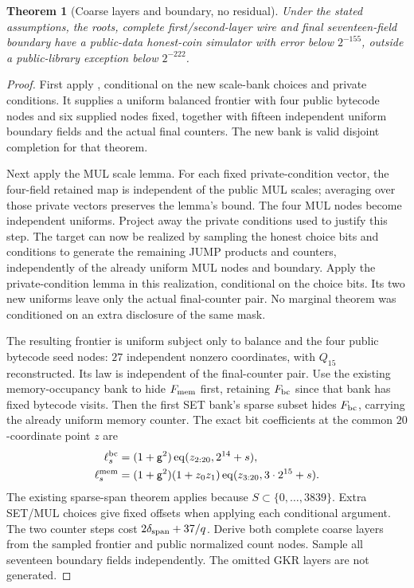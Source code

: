 \documentclass[11pt]{article}
\newtheorem{theorem}{Theorem}
\begin{document}
\begin{theorem}[Coarse layers and boundary, no residual]
Under the stated assumptions, the roots, complete first/second-layer wire and final seventeen-field boundary have a public-data honest-coin simulator with error below $2^{-155}$, outside a public-library exception below $2^{-222}$.
\end{theorem}
\begin{proof}
First apply , conditional on the new scale-bank choices and private conditions. It supplies a uniform balanced frontier with four public bytecode nodes and six supplied nodes fixed, together with fifteen independent uniform boundary fields and the actual final counters. The new bank is valid disjoint completion for that theorem.

Next apply the MUL scale lemma. For each fixed private-condition vector, the four-field retained map is independent of the public MUL scales; averaging over those private vectors preserves the lemma's bound. The four MUL nodes become independent uniforms. Project away the private conditions used to justify this step. The target can now be realized by sampling the honest choice bits and conditions to generate the remaining JUMP products and counters, independently of the already uniform MUL nodes and boundary. Apply the private-condition lemma in this realization, conditional on the choice bits. Its two new uniforms leave only the actual final-counter pair. No marginal theorem was conditioned on an extra disclosure of the same mask.

The resulting frontier is uniform subject only to balance and the four public bytecode seed nodes: $27$ independent nonzero coordinates, with $Q_{15}$ reconstructed. Its law is independent of the final-counter pair. Use the existing memory-occupancy bank to hide $F_{\rm mem}$ first, retaining $F_{\rm bc}$ since that bank has fixed bytecode visits. Then the first SET bank's sparse subset hides $F_{\rm bc}$, carrying the already uniform memory counter. The exact bit coefficients at the common $20$-coordinate point $z$ are
\[
\begin{aligned}
 \ell_s^{\rm bc}&=(1+\mathsf{g}^2)\operatorname{eq}(z_{2:20},2^{14}+s),\\
 \ell_s^{\rm mem}&=(1+\mathsf{g}^2)(1+z_0z_1)\operatorname{eq}(z_{3:20},3\cdot2^{15}+s).
\end{aligned}
\]
The existing sparse-span theorem applies because $S\subset\{0,\ldots,3839\}$. Extra SET/MUL choices give fixed offsets when applying each conditional argument. The two counter steps cost $2\delta_{\rm span}+37/q$. Derive both complete coarse layers from the sampled frontier and public normalized count nodes. Sample all seventeen boundary fields independently. The omitted GKR layers are not generated.
\end{proof}
\end{document}
